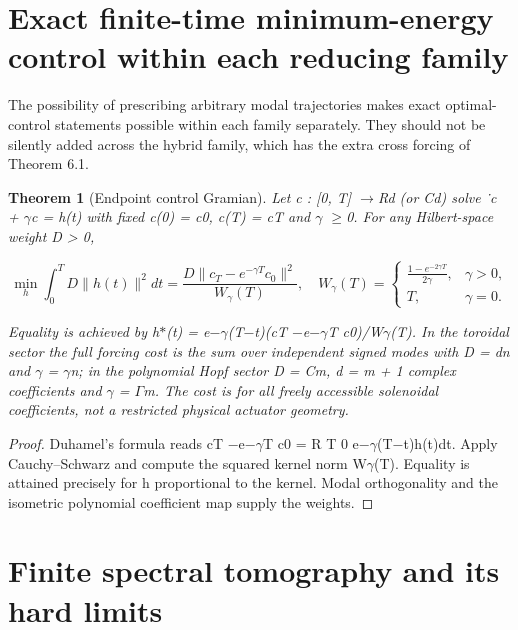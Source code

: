 \documentclass[10pt,letterpaper]{article}
\newtheorem{theorem}{Theorem}[section]
\theoremstyle{remark}
\begin{document}
\section{Exact finite-time minimum-energy control within each reducing family}


The possibility of prescribing arbitrary modal trajectories makes exact optimal-control statements possible within each family separately. They should not be silently added across the hybrid family, which has the extra cross forcing of Theorem 6.1.


\begin{theorem}[Endpoint control Gramian]

Let c : [0, T] \(\to \)Rd (or Cd) solve ˙c + \(\gamma \)c = h(t) with fixed c(0) = c0, c(T) = cT and \(\gamma \) \(\ge \)0. For any Hilbert-space weight D > 0,


\begin{equation}
\tag{72}\label{eq:72}
\min_h\int_0^T D\|h(t)\|^2dt=\frac{D\|c_T-e^{-\gamma T}c_0\|^2}{W_\gamma(T)},\quad W_\gamma(T)=\begin{cases}\frac{1-e^{-2\gamma T}}{2\gamma},&\gamma>0,\\T,&\gamma=0.\end{cases}
\end{equation}

Equality is achieved by h\(\ast \)(t) = e\(- \gamma \)(T\(- \)t)(cT \(- \)e\(- \gamma \)T c0)/W\(\gamma \)(T). In the toroidal sector the full forcing cost is the sum over independent signed modes with D = dn and \(\gamma \) = \(\gamma \)n; in the polynomial Hopf sector D = Cm, d = m + 1 complex coefficients and \(\gamma \) = \(\Gamma \)m. The cost is for all freely accessible solenoidal coefficients, not a restricted physical actuator geometry.


\end{theorem}

\begin{proof}
Duhamel’s formula reads cT \(- \)e\(- \gamma \)T c0 = R T 0 e\(- \gamma \)(T\(- \)t)h(t)dt. Apply Cauchy–Schwarz and compute the squared kernel norm W\(\gamma \)(T). Equality is attained precisely for h proportional to the kernel. Modal orthogonality and the isometric polynomial coefficient map supply the weights.

\end{proof}

\section{Finite spectral tomography and its hard limits}
\end{document}
